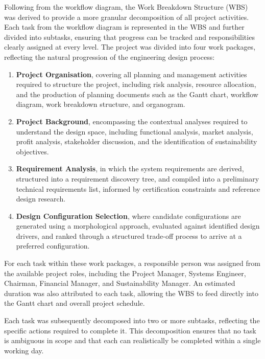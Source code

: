 Following from the workflow diagram, the Work Breakdown Structure (WBS) was derived to provide a more granular decomposition of all project activities. Each task from the workflow diagram is represented in the WBS and further divided into subtasks, ensuring that progress can be tracked and responsibilities clearly assigned at every level.
The project was divided into four work packages, reflecting the natural progression of the engineering design process:

\begin{enumerate}

\item \textbf{Project Organisation}, covering all planning and management activities required to structure the project, including risk analysis, resource allocation, and the production of planning documents such as the Gantt chart, workflow diagram, work breakdown structure, and organogram.

\item \textbf{Project Background}, encompassing the contextual analyses required to understand the design space, including functional analysis, market analysis, profit analysis, stakeholder discussion, and the identification of sustainability objectives.

\item \textbf{Requirement Analysis}, in which the system requirements are derived, structured into a requirement discovery tree, and compiled into a preliminary technical requirements list, informed by certification constraints and reference design research.

\item \textbf{Design Configuration Selection}, where candidate configurations are generated using a morphological approach, evaluated against identified design drivers, and ranked through a structured trade-off process to arrive at a preferred configuration.

\end{enumerate}

For each task within these work packages, a responsible person was assigned from the available project roles, including the Project Manager, Systems Engineer, Chairman, Financial Manager, and Sustainability Manager. An estimated duration was also attributed to each task, allowing the WBS to feed directly into the Gantt chart and overall project schedule.

Each task was subsequently decomposed into two or more subtasks, reflecting the specific actions required to complete it. This decomposition ensures that no task is ambiguous in scope and that each can realistically be completed within a single working day.

